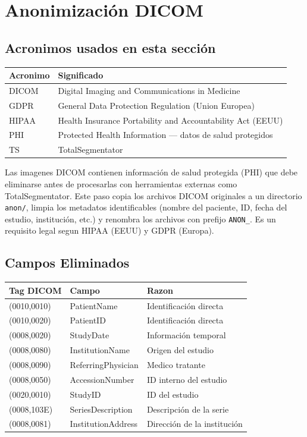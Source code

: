 \documentclass[12pt,a4paper]{article}
\begin{document}
\section{Anonimización DICOM}
\label{sec:anonimizacion}

\subsection*{Acronimos usados en esta sección}
\begin{tabular}{ll}
\toprule
\textbf{Acronimo} & \textbf{Significado} \\
\midrule
DICOM & Digital Imaging and Communications in Medicine \\
GDPR & General Data Protection Regulation (Union Europea) \\
HIPAA & Health Insurance Portability and Accountability Act (EEUU) \\
PHI & Protected Health Information --- datos de salud protegidos \\
TS & TotalSegmentator \\
\bottomrule
\end{tabular}

Las imagenes DICOM contienen información de salud protegida (PHI) que debe eliminarse antes de
procesarlas con herramientas externas como TotalSegmentator. Este paso copia los archivos DICOM
originales a un directorio \texttt{anon/}, limpia los metadatos identificables (nombre del
paciente, ID, fecha del estudio, institución, etc.) y renombra los archivos con prefijo
\texttt{ANON\_}. Es un requisito legal segun HIPAA (EEUU) y GDPR (Europa).

\subsection{Campos Eliminados}

\begin{table}[H]
\centering
\begin{tabular}{l l l}
\toprule
\textbf{Tag DICOM} & \textbf{Campo} & \textbf{Razon} \\
\midrule
(0010,0010) & PatientName & Identificación directa \\
(0010,0020) & PatientID & Identificación directa \\
(0008,0020) & StudyDate & Información temporal \\
(0008,0080) & InstitutionName & Origen del estudio \\
(0008,0090) & ReferringPhysician & Medico tratante \\
(0008,0050) & AccessionNumber & ID interno del estudio \\
(0020,0010) & StudyID & ID del estudio \\
(0008,103E) & SeriesDescription & Descripción de la serie \\
(0008,0081) & InstitutionAddress & Dirección de la institución \\
\bottomrule
\end{tabular}
\end{table}
\end{document}
